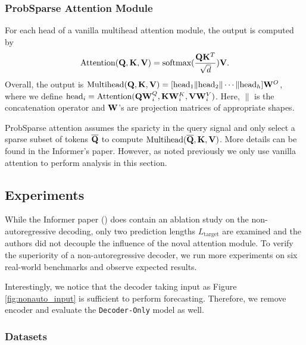 \subsubsection{ProbSparse Attention Module}
For each head of a vanilla multihead attention module, the output is computed by $$\text{Attention}(\mathbf{Q}, \mathbf{K}, \mathbf{V}) = \text{softmax}(\frac{\mathbf{Q}\mathbf{K}^T}{\sqrt{d}}) \mathbf{V}.$$
Overall, the output is $\text{Multihead}(\mathbf{Q}, \mathbf{K}, \mathbf{V}) = [\text{head}_1 \| \text{head}_2 \| \cdots \| \text{head}_h]\mathbf{W}^O$, where we define $\text{head}_i = \text{Attention}(\mathbf{Q}\mathbf{W}_i^Q, \mathbf{K}\mathbf{W}_i^K, \mathbf{V}\mathbf{W}_i^V)$. 
Here, $\|$ is the concatenation operator and $\mathbf{W}$'s are projection matrices of appropriate shapes. 

ProbSparse attention assumes the sparicty in the query signal and only select a sparse subset of tokens $\overline{\mathbf{Q}}$ to compute $\text{Multihead}(\overline{\mathbf{Q}}, \mathbf{K}, \mathbf{V})$. 
More details can be found in the Informer's paper. 
However, as noted previously we only use vanilla attention to perform analysis in this section. 

\subsection{Experiments}

While the Informer paper (\citet{https://doi.org/10.48550/arxiv.2012.07436}) does contain an ablation study on the non-autoregressive decoding, only two prediction lengths $L_\text{target}$ are examined and the authors did not decouple the influence of the noval attention module. 
To verify the superiority of a non-autoregressive decoder, we run more experiments on six real-world benchmarks and observe expected results. 

Interestingly, we notice that the decoder taking input as Figure \ref{fig:nonauto_input} is sufficient to perform forecasting. 
Therefore, we remove encoder and evaluate the \texttt{Decoder-Only} model as well. 

\subsubsection{Datasets}\label{benchmarks}

